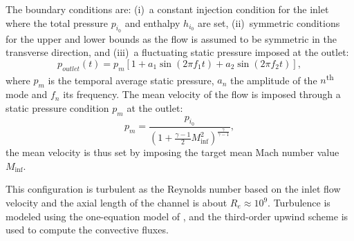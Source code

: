 The boundary conditions are: (i)~a constant injection condition for the inlet
where the total pressure $p_{i_0}$ and enthalpy $h_{i_0}$ are set,
(ii)~symmetric conditions for the upper and lower bounds as the flow
is assumed to be symmetric in the transverse direction, and (iii)~a
fluctuating static pressure imposed at the outlet:
\begin{equation}
  p_{outlet}(t) = p_m \left[1 + a_1 \sin(2 \pi f_1 t) +
    a_2 \sin(2 \pi f_2 t) \right],
  \label{eq:outlet_canal}
\end{equation}
where $p_m$ is the temporal average static pressure, $a_n$ the
amplitude of the $n$\textsuperscript{th} mode and $f_n$ its
frequency.
The mean velocity of the flow is imposed through a
static pressure condition $p_m$ at the outlet:
\begin{equation}
    p_m = \frac{p_{i_0}}{\left(1 + 
    \frac{\gamma - 1}{2} M_{\inf}^2 \right) ^ {\frac{\gamma}{ \gamma - 1}}} ,
\end{equation}
the mean velocity is thus set by imposing the
target mean Mach number value $M_{\inf}$.

This configuration is turbulent as the Reynolds number based on the
inlet flow velocity and the axial length of the channel is about $R_e
\approx 10^9$.  Turbulence is modeled using the
one-equation model of \citet{Spalart1992}, and the
third-order upwind \citet{Roe1981} scheme is used to compute the
convective fluxes.
